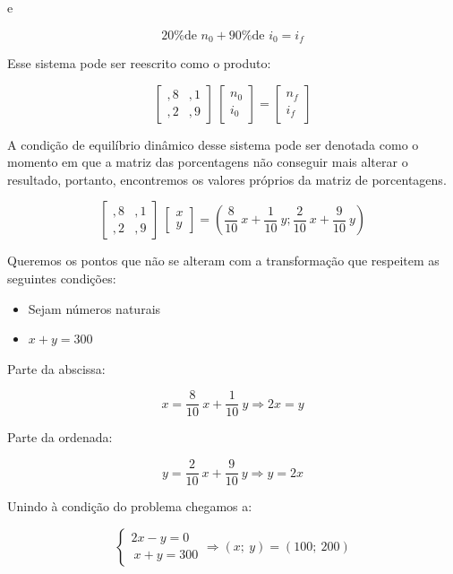 \documentclass[a4paper,12pt]{article}
\begin{document}
e

$$ \text{20\% de } n_{0} + \text{90\% de } i_{0} = i_{f} $$

Esse sistema pode ser reescrito como o produto:

$$ \begin{bmatrix}
,8 & ,1\\
,2 & ,9
\end{bmatrix} \ \begin{bmatrix}
n_{0} \\
i_{0}
\end{bmatrix} = \begin{bmatrix}
n_{f}\\
i_{f}
\end{bmatrix} $$

A condição de equilíbrio dinâmico desse sistema pode ser denotada como o momento em que a matriz das porcentagens não conseguir mais alterar o resultado, portanto, encontremos os valores próprios da matriz de porcentagens.

$$ \begin{bmatrix}
,8 & ,1\\
,2 & ,9
\end{bmatrix} \ \begin{bmatrix}
x \\
y
\end{bmatrix} = (\frac{8}{10} \ x + \frac{1}{10} \ y; \frac{2}{10} \ x + \frac{9}{10} \ y) $$

Queremos os pontos que não se alteram com a transformação que respeitem as seguintes condições:

\begin{itemize}
    \item Sejam números naturais
    
    \item $ x + y = 300 $
\end{itemize}

Parte da abscissa:

$$ x = \frac{8}{10} \ x + \frac{1}{10} \ y \Rightarrow 2x = y $$

Parte da ordenada:

$$ y =  \frac{2}{10} \ x + \frac{9}{10} \ y \Rightarrow y = 2x $$

\newpage

Unindo à condição do problema chegamos a:

$$ \left\{\begin{matrix}
2x - y = 0\\
\ x + y = 300
\end{matrix}\right. \Rightarrow (x; \ y) = (100; \ 200) $$
\end{document}
